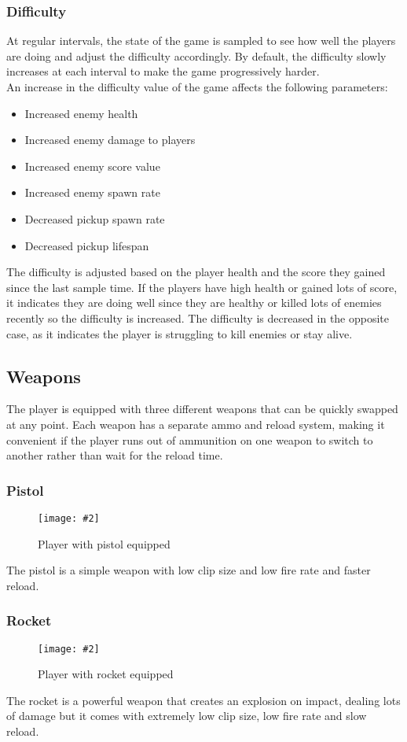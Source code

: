 \documentclass{article}
\newcommand{\n}[0]{\\[\baselineskip]}
\newcommand{\figimg}[3]{
  \begin{figure}[H]
    \centering
    \texttt{[image: \#2]}
    \caption{#3}
  \end{figure}
  \noindent 
}
\begin{document}
\subsubsection{Difficulty}
At regular intervals, the state of the game is sampled to see how well the players are doing and adjust the difficulty accordingly. By default, the difficulty slowly increases at each interval to make the game progressively harder.
\n
An increase in the difficulty value of the game affects the following parameters:
\begin{itemize}
\item Increased enemy health
\item Increased enemy damage to players
\item Increased enemy score value
\item Increased enemy spawn rate
\item Decreased pickup spawn rate
\item Decreased pickup lifespan
\end{itemize}
The difficulty is adjusted based on the player health and the score they gained since the last sample time. If the players have high health or gained lots of score, it indicates they are doing well since they are healthy or killed lots of enemies recently so the difficulty is increased. The difficulty is decreased in the opposite case, as it indicates the player is struggling to kill enemies or stay alive.

\subsection{Weapons}
The player is equipped with three different weapons that can be quickly swapped at any point. Each weapon has a separate ammo and reload system, making it convenient if the player runs out of ammunition on one weapon to switch to another rather than wait for the reload time.
\subsubsection{Pistol}
\figimg{0.1}{imgs/Gun.png}{Player with pistol equipped}
The pistol is a simple weapon with low clip size and low fire rate and faster reload.

\subsubsection{Rocket}
\figimg{0.1}{imgs/Rocket.png}{Player with rocket equipped}
The rocket is a powerful weapon that creates an explosion on impact, dealing lots of damage but it comes with extremely low clip size, low fire rate and slow reload.
\end{document}
